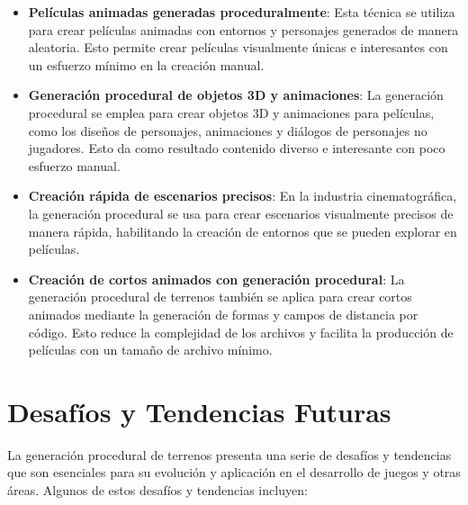 \begin{itemize}
    \item \textbf{Películas animadas generadas proceduralmente}: Esta técnica se utiliza para crear películas animadas con entornos y personajes generados de manera aleatoria. Esto permite crear películas visualmente únicas e interesantes con un esfuerzo mínimo en la creación manual\cite{ProcedurallyGeneratedAnimatedFilms}.
    
    \item \textbf{Generación procedural de objetos 3D y animaciones}: La generación procedural se emplea para crear objetos 3D y animaciones para películas, como los diseños de personajes, animaciones y diálogos de personajes no jugadores. Esto da como resultado contenido diverso e interesante con poco esfuerzo manual\cite{ProceduralGeneration3DObjects}.
    
    \item \textbf{Creación rápida de escenarios precisos}: En la industria cinematográfica, la generación procedural se usa para crear escenarios visualmente precisos de manera rápida, habilitando la creación de entornos que se pueden explorar en películas\cite{CreatingVisuallyInterestingSpaces}.
    
    \item \textbf{Creación de cortos animados con generación procedural}: La generación procedural de terrenos también se aplica para crear cortos animados mediante la generación de formas y campos de distancia por código. Esto reduce la complejidad de los archivos y facilita la producción de películas con un tamaño de archivo mínimo\cite{ShortAnimatedMoviesProceduralGeneration}.
\end{itemize}

\section{Desafíos y Tendencias Futuras}

La generación procedural de terrenos presenta una serie de desafíos y tendencias que son esenciales para su evolución y aplicación en el desarrollo de juegos y otras áreas. Algunos de estos desafíos y tendencias incluyen:


